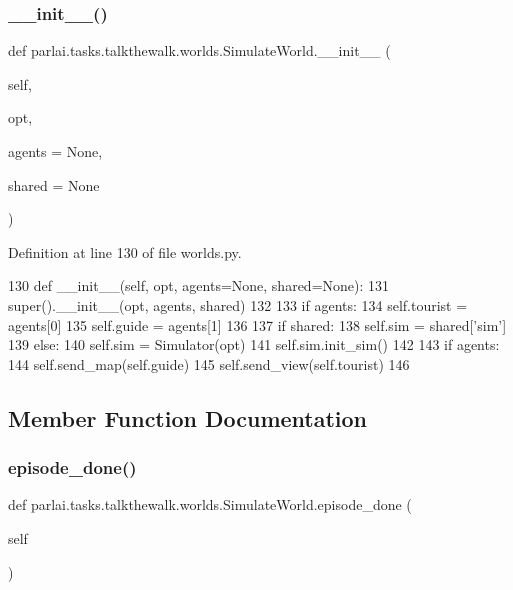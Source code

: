 \subsubsection{\texorpdfstring{\+\_\+\+\_\+init\+\_\+\+\_\+()}{\_\_init\_\_()}}
{\footnotesize\ttfamily def parlai.\+tasks.\+talkthewalk.\+worlds.\+Simulate\+World.\+\_\+\+\_\+init\+\_\+\+\_\+ (\begin{DoxyParamCaption}\item[{}]{self,  }\item[{}]{opt,  }\item[{}]{agents = {\ttfamily None},  }\item[{}]{shared = {\ttfamily None} }\end{DoxyParamCaption})}



Definition at line 130 of file worlds.\+py.


\begin{DoxyCode}
130     \textcolor{keyword}{def }\_\_init\_\_(self, opt, agents=None, shared=None):
131         super().\_\_init\_\_(opt, agents, shared)
132 
133         \textcolor{keywordflow}{if} agents:
134             self.tourist = agents[0]
135             self.guide = agents[1]
136 
137         \textcolor{keywordflow}{if} shared:
138             self.sim = shared[\textcolor{stringliteral}{'sim'}]
139         \textcolor{keywordflow}{else}:
140             self.sim = Simulator(opt)
141             self.sim.init\_sim()
142 
143         \textcolor{keywordflow}{if} agents:
144             self.send\_map(self.guide)
145             self.send\_view(self.tourist)
146 
\end{DoxyCode}


\subsection{Member Function Documentation}
\mbox{\label{classparlai_1_1tasks_1_1talkthewalk_1_1worlds_1_1SimulateWorld_a617e95ecc8ed3dd19c3cc391c4129b42}} 
\subsubsection{\texorpdfstring{episode\+\_\+done()}{episode\_done()}}
{\footnotesize\ttfamily def parlai.\+tasks.\+talkthewalk.\+worlds.\+Simulate\+World.\+episode\+\_\+done (\begin{DoxyParamCaption}\item[{}]{self }\end{DoxyParamCaption})}



